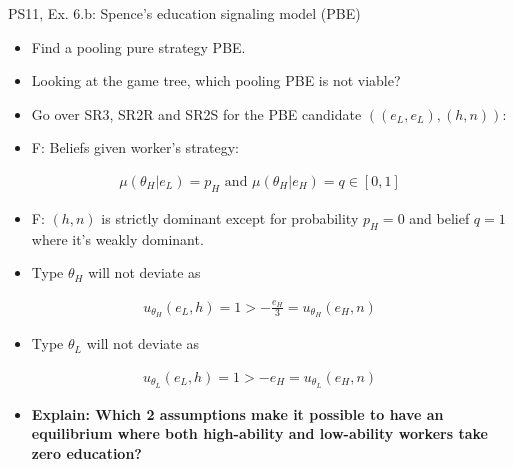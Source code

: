 \begin{frame}{PS11, Ex. 6.b: Spence’s education signaling model (PBE)}
    \begin{multicols}{2}
      \begin{itemize}
        \item[(b)] Find a pooling pure strategy PBE.
        \item[Step 1:] Looking at the game tree, which pooling PBE is not viable?
        \item[Step 2:] Go over SR3, SR2R and SR2S for the PBE candidate $((e_L,e_L),(h,n))$:
        \item[SR3:] F: Beliefs given worker's strategy:
      \end{itemize}\vspace{-10pt}
      \begin{align*}
        \mu(\theta_H|e_L)=p_H\text{ and }\mu(\theta_H|e_H)=q\in[0,1]
      \end{align*}\vspace{-18pt}
      \begin{itemize}
        \item[SR2R:] F: $(h,n)$ is strictly dominant except for probability $p_H=0$ and belief $q=1$ where it's weakly dominant.
        \item[SR2S:] Type $\theta_H$ will not deviate as
      \end{itemize}\vspace{-8pt}
      \begin{align*}
        u_{\theta_H}(e_L,h)=1>-\frac{e_H}{3}=u_{\theta_H}(e_H,n)
      \end{align*}\vspace{-16pt}
      \begin{itemize}
        \item[] Type $\theta_L$ will not deviate as
      \end{itemize}\vspace{-8pt}
      \begin{align*}
        u_{\theta_L}(e_L,h)=1>-e_H=u_{\theta_L}(e_H,n)
      \end{align*}\vspace{-16pt}
      \begin{itemize}
        \item[Step 3:] \textbf{Explain: Which 2 assumptions make it possible to have an equilibrium where both high-ability and low-ability workers take zero education?}
      \end{itemize}
      \vfill\null\columnbreak
      \begin{figure}[!h]

\end{figure}
\end{multicols}
\end{frame}
